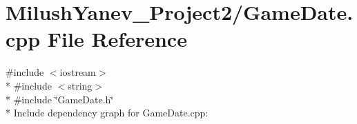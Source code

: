 \section{Milush\+Yanev\+\_\+\+Project2/\+Game\+Date.cpp File Reference}
\label{_game_date_8cpp}
{\ttfamily \#include $<$iostream$>$}\\*
{\ttfamily \#include $<$string$>$}\\*
{\ttfamily \#include \char`\"{}Game\+Date.\+h\char`\"{}}\\*
Include dependency graph for Game\+Date.\+cpp\+:
